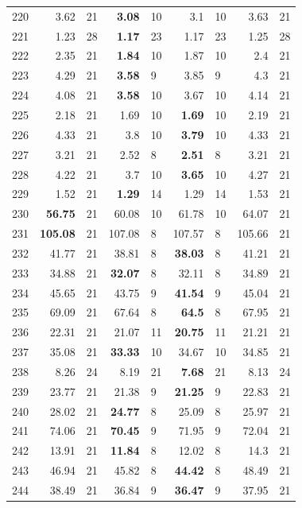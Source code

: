 \begin{longtable}{lr@{\hskip 4pt}l@{\hskip 12pt}r@{\hskip 4pt}l@{\hskip 12pt}r@{\hskip 4pt}l@{\hskip 12pt}r@{\hskip 4pt}l@{\hskip 12pt}}
220 & 3.62 & 21 & \textbf{3.08} & 10 & 3.1 & 10 & 3.63 & 21 \\
221 & 1.23 & 28 & \textbf{1.17} & 23 & 1.17 & 23 & 1.25 & 28 \\
222 & 2.35 & 21 & \textbf{1.84} & 10 & 1.87 & 10 & 2.4 & 21 \\
223 & 4.29 & 21 & \textbf{3.58} & 9 & 3.85 & 9 & 4.3 & 21 \\
224 & 4.08 & 21 & \textbf{3.58} & 10 & 3.67 & 10 & 4.14 & 21 \\
225 & 2.18 & 21 & 1.69 & 10 & \textbf{1.69} & 10 & 2.19 & 21 \\
226 & 4.33 & 21 & 3.8 & 10 & \textbf{3.79} & 10 & 4.33 & 21 \\
227 & 3.21 & 21 & 2.52 & 8 & \textbf{2.51} & 8 & 3.21 & 21 \\
228 & 4.22 & 21 & 3.7 & 10 & \textbf{3.65} & 10 & 4.27 & 21 \\
229 & 1.52 & 21 & \textbf{1.29} & 14 & 1.29 & 14 & 1.53 & 21 \\
230 & \textbf{56.75} & 21 & 60.08 & 10 & 61.78 & 10 & 64.07 & 21 \\
231 & \textbf{105.08} & 21 & 107.08 & 8 & 107.57 & 8 & 105.66 & 21 \\
232 & 41.77 & 21 & 38.81 & 8 & \textbf{38.03} & 8 & 41.21 & 21 \\
233 & 34.88 & 21 & \textbf{32.07} & 8 & 32.11 & 8 & 34.89 & 21 \\
234 & 45.65 & 21 & 43.75 & 9 & \textbf{41.54} & 9 & 45.04 & 21 \\
235 & 69.09 & 21 & 67.64 & 8 & \textbf{64.5} & 8 & 67.95 & 21 \\
236 & 22.31 & 21 & 21.07 & 11 & \textbf{20.75} & 11 & 21.21 & 21 \\
237 & 35.08 & 21 & \textbf{33.33} & 10 & 34.67 & 10 & 34.85 & 21 \\
238 & 8.26 & 24 & 8.19 & 21 & \textbf{7.68} & 21 & 8.13 & 24 \\
239 & 23.77 & 21 & 21.38 & 9 & \textbf{21.25} & 9 & 22.83 & 21 \\
240 & 28.02 & 21 & \textbf{24.77} & 8 & 25.09 & 8 & 25.97 & 21 \\
241 & 74.06 & 21 & \textbf{70.45} & 9 & 71.95 & 9 & 72.04 & 21 \\
242 & 13.91 & 21 & \textbf{11.84} & 8 & 12.02 & 8 & 14.3 & 21 \\
243 & 46.94 & 21 & 45.82 & 8 & \textbf{44.42} & 8 & 48.49 & 21 \\
244 & 38.49 & 21 & 36.84 & 9 & \textbf{36.47} & 9 & 37.95 & 21 \\

\end{longtable}

